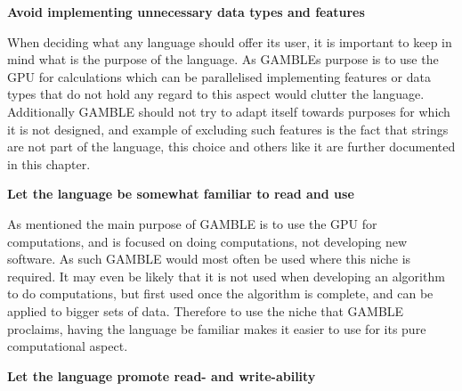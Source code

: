 \textbf{Avoid implementing unnecessary data types and features}

When deciding what any language should offer its user, it is important to keep in mind what is the purpose of the language.
As GAMBLEs purpose is to use the GPU for calculations which can be parallelised implementing features or data types that do not hold any regard to this aspect would clutter the language.
Additionally GAMBLE should not try to adapt itself towards purposes for which it is not designed, and example of excluding such features is the fact that strings are not part of the language, this choice and others like it are further documented in this chapter.

\textbf{Let the language be somewhat familiar to read and use}

As mentioned the main purpose of GAMBLE is to use the GPU for computations, and is focused on doing computations, not developing new software.
As such GAMBLE would most often be used where this niche is required.
It may even be likely that it is not used when developing an algorithm to do computations, but first used once the algorithm is complete, and can be applied to bigger sets of data.
Therefore to use the niche that GAMBLE proclaims, having the language be familiar makes it easier to use for its pure computational aspect.

\textbf{Let the language promote read- and write-ability}

